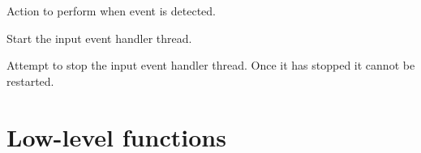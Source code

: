 \documentclass[letterpaper,10pt,english]{sphinxmanual}
\begin{document}
\begin{fulllineitems}
\begin{fulllineitems}
\begin{quote}
\begin{description}
\end{description}\end{quote}

Action to perform when event is detected.

\end{fulllineitems}


\begin{fulllineitems}
\label{\detokenize{index:rcpy.gpio.InputEvent.start}}
Start the input event handler thread.

\end{fulllineitems}


\begin{fulllineitems}
\label{\detokenize{index:rcpy.gpio.InputEvent.stop}}
Attempt to stop the input event handler thread. Once it has stopped it cannot be restarted.

\end{fulllineitems}


\end{fulllineitems}



\section{Low-level functions}
\label{\detokenize{index:id2}}
\end{document}

